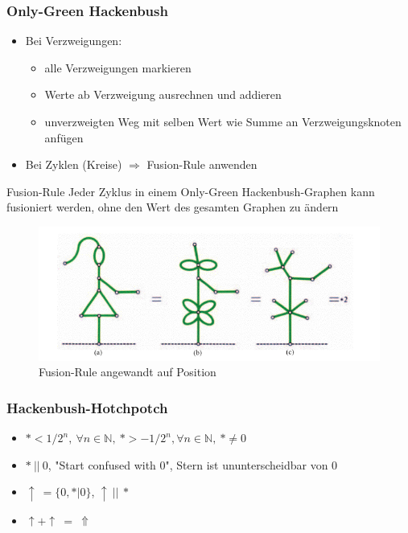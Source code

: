 \documentclass[12pt, aspectratio=169]{beamer}
\begin{document}
\begin{frame}
    \frametitle{Only-Green Hackenbush}
    \begin{itemize}
        \item<1-> Bei Verzweigungen:
        \begin{itemize}
            \item<1-> alle Verzweigungen markieren
            \item<1-> Werte ab Verzweigung ausrechnen und addieren
            \item<1-> unverzweigten Weg mit selben Wert wie Summe an Verzweigungsknoten anfügen
        \end{itemize}
        \item<2-> Bei Zyklen (Kreise) $\Rightarrow$ Fusion-Rule anwenden
    \end{itemize}
     {
    \begin{block}{Fusion-Rule}
        Jeder Zyklus in einem Only-Green Hackenbush-Graphen kann fusioniert werden,
        ohne den Wert des gesamten Graphen zu ändern
    \end{block}
    }
\end{frame}

\begin{frame}
    \begin{figure}
        \includegraphics[width=\textwidth]{pic/green-girl.png}
        \caption{Fusion-Rule angewandt auf Position \tiny{\cite{ww}}}
    \end{figure}
\end{frame}

\begin{frame}
    \frametitle{Hackenbush-Hotchpotch}
    \begin{itemize}
        \item<1-> $* < 1/2^n, \: \forall n \in \mathbb{N}, \: * > -1/2^n, \forall n \in \mathbb{N}, \: * \neq 0$
        \item<2-> $* \: || \: 0$, "Start confused with 0", Stern ist ununterscheidbar von 0
        \item<3-> $\uparrow \: = \{0,* | 0\}$, $\uparrow \: || \: *$
        \item<3-> $\uparrow + \uparrow \: = \: \Uparrow$
    \end{itemize}
\end{frame}
\end{document}
